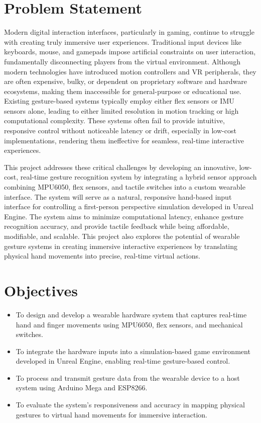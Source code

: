 \vspace{1.5\baselineskip} 

\section{Problem Statement}
Modern digital interaction interfaces, particularly in gaming, continue to struggle with creating truly immersive user experiences. Traditional input devices like keyboards, mouse, and gamepads impose artificial constraints on user interaction, fundamentally disconnecting players from the virtual environment. Although modern technologies have introduced motion controllers and VR peripherals, they are often expensive, bulky, or dependent on proprietary software and hardware ecosystems, making them inaccessible for general-purpose or educational use. Existing gesture-based systems typically employ either flex sensors or IMU sensors alone, leading to either limited resolution in motion tracking or high computational complexity. These systems often fail to provide intuitive, responsive control without noticeable latency or drift, especially in low-cost implementations, rendering them ineffective for seamless, real-time interactive experiences.  

This project addresses these critical challenges by developing an innovative, low-cost, real-time gesture recognition system by integrating a hybrid sensor approach combining MPU6050, flex sensors, and tactile switches into a custom wearable interface. The system will serve as a natural, responsive hand-based input interface for controlling a first-person perspective simulation developed in Unreal Engine. The system aims to minimize computational latency, enhance gesture recognition accuracy, and provide tactile feedback while being affordable, modifiable, and scalable. This project also explores the potential of wearable gesture systems in creating immersive interactive experiences by translating physical hand movements into precise, real-time virtual actions. 

\vspace{1.5\baselineskip} 

\section{Objectives}
\begin{itemize}
    \item To design and develop a wearable hardware system that captures real-time hand and finger movements using MPU6050, flex sensors, and mechanical switches.
    \item To integrate the hardware inputs into a simulation-based game environment developed in Unreal Engine, enabling real-time gesture-based control.
    \item To process and transmit gesture data from the wearable device to a host system using Arduino Mega and ESP8266.
    \item To evaluate the system's responsiveness and accuracy in mapping physical gestures to virtual hand movements for immersive interaction.
\end{itemize}

